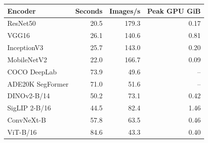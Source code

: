 \begin{tabular}{lrrr}
\toprule
Encoder & Seconds & Images/s & Peak GPU GiB\\
\midrule
ResNet50 & 20.5 & 179.3 & 0.17\\
VGG16 & 26.1 & 140.6 & 0.81\\
InceptionV3 & 25.7 & 143.0 & 0.20\\
MobileNetV2 & 22.0 & 166.7 & 0.09\\
COCO DeepLab & 73.9 & 49.6 & --\\
ADE20K SegFormer & 71.0 & 51.6 & --\\
DINOv2-B/14 & 50.2 & 73.1 & 0.42\\
SigLIP 2-B/16 & 44.5 & 82.4 & 1.46\\
ConvNeXt-B & 57.8 & 63.5 & 0.46\\
ViT-B/16 & 84.6 & 43.3 & 0.40\\
\bottomrule
\end{tabular}
